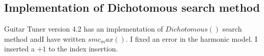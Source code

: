 \subsection{Implementation of Dichotomous search method}
Guitar Tuner version 4.2 has an implementation of $Dichotomous()$ search method andI have written $smc_max()$. I fixed an error in the harmonic model. I inserted a $+1$ to the index insertion.  
\label{task:20141012_0}
